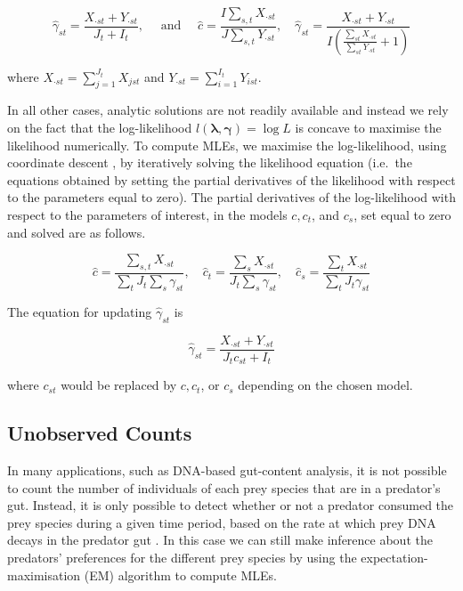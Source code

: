 \documentclass[12pt]{article}
\begin{document}
\begin{equation*}
  \hat{\gamma}_{st} = \frac{X_{\cdot st} + Y_{\cdot st}}{J_t + I_t}, \quad \text{ and } \quad \hat{c} = \frac{I \sum_{s,t} X_{\cdot st}}{J \sum_{s,t} Y_{\cdot st}}, \quad \hat{\gamma}_{st} = \frac{X_{\cdot st} + Y_{\cdot st}}{I \left( \frac{\sum_{st} X_{\cdot st}}{\sum_{st} Y_{\cdot st}} + 1 \right)}
\end{equation*}

\noindent where $X_{\cdot st} = \sum_{j=1}^{J_t}X_{jst}$ and $Y_{\cdot st} = \sum_{i=1}^{I_t} Y_{ist}$.

In all other cases, analytic solutions are not readily available and instead we rely on the fact that the log-likelihood $l(\boldsymbol{\lambda}, \boldsymbol{\gamma}) = \log{L}$ is concave to maximise the likelihood numerically.  To compute MLEs, we maximise the log-likelihood, using coordinate descent \citep{Luo:1992}, by iteratively solving the likelihood equation (i.e.\, the equations obtained by setting the partial derivatives of the likelihood with respect to the parameters equal to zero).  The partial derivatives of the log-likelihood with respect to the parameters of interest, in the models $c, c_t$, and $c_s$, set equal to zero and solved are as follows.

\begin{equation*}
  \hat{c} = \frac{\sum_{s,t} X_{\cdot st}}{\sum_t J_t \sum_s \gamma_{st}}, \quad \hat{c}_t =  \frac{\sum_s X_{\cdot st}}{J_t \sum_s \gamma_{st}}, \quad \hat{c}_s = \frac{\sum_{t}X_{\cdot st}}{\sum_t J_t \gamma_{st}}
\end{equation*}

\noindent The equation for updating $\hat \gamma_{st}$ is

\[ \hat{\gamma}_{st} = \frac{X_{\cdot st} + Y_{\cdot st}}{J_t c_{st} + I_t} \]

\noindent where $c_{st}$ would be replaced by $c, c_t$, or $c_s$ depending on the chosen model.

\subsection{Unobserved Counts}
\label{sec:noncount}

In many applications, such as DNA-based gut-content analysis, it is not possible to count the number of individuals of each prey species that are in a predator's gut.  Instead, it is only possible to detect whether or not a predator consumed the prey species during a given time period, based on the rate at which prey DNA decays in the predator gut \citep{Greenstone:2013}.  In this case we can still make inference about the predators' preferences for the different prey species by using the expectation-maximisation (EM) algorithm to compute MLEs.
\end{document}
